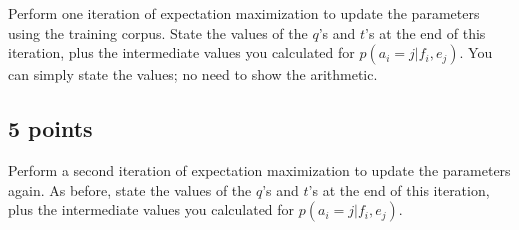 \documentclass[12pt,a4paper]{article}
\begin{document}
Perform one iteration of expectation maximization to update the parameters using the training corpus. State the values of the $q$'s and $t$'s at the end of this iteration, plus the intermediate values you calculated for $p(a_i = j | f_i, e_j)$. You can simply state the values; no need to show the arithmetic.

\subsection{5 points}

Perform a second iteration of expectation maximization to update the parameters again. As before, state the values of the $q$'s and $t$'s at the end of this iteration, plus the intermediate values you calculated for $p(a_i = j | f_i, e_j)$.
\end{document}
